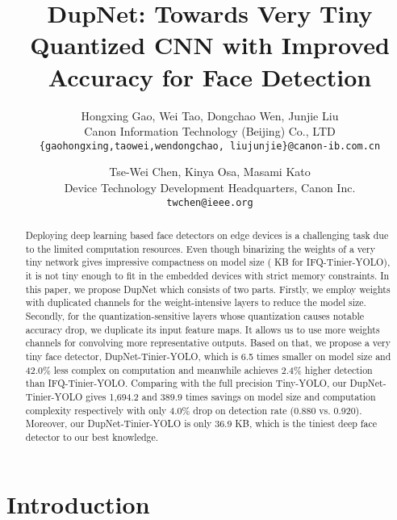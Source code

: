 \documentclass[10pt,twocolumn,letterpaper]{article}
\begin{document}
\title{DupNet: Towards Very Tiny Quantized CNN  with Improved Accuracy for Face Detection}

\author{Hongxing Gao, Wei Tao, Dongchao Wen, Junjie Liu\\
	Canon Information Technology (Beijing) Co., LTD\\
{\tt\small \{gaohongxing,taowei,wendongchao, liujunjie\}@canon-ib.com.cn}
\and
	Tse-Wei Chen, Kinya Osa, Masami Kato\\
	Device Technology Development Headquarters, Canon Inc.\\
{\tt\small twchen@ieee.org}
}

\maketitle

\ifcvprfinal\thispagestyle{empty}\fi

\begin{abstract}
		
Deploying deep learning based face detectors on edge devices is a challenging task due to the limited computation resources. Even though binarizing the weights of a very tiny network gives impressive compactness on model size ( KB for IFQ-Tinier-YOLO), it is not tiny enough to fit in the embedded devices with strict memory constraints. In this paper, we propose DupNet which consists of two parts. Firstly, we employ weights with duplicated channels for the weight-intensive layers to reduce the model size. Secondly, for the quantization-sensitive layers whose quantization causes notable accuracy drop, we duplicate its input feature maps. It allows us to use more weights channels for convolving more representative outputs. Based on that, we propose a very tiny face detector, DupNet-Tinier-YOLO, which is 6.5 times smaller on model size and 42.0\% less complex on computation and meanwhile achieves 2.4\% higher detection than IFQ-Tinier-YOLO. Comparing with the full precision Tiny-YOLO, our DupNet-Tinier-YOLO gives 1,694.2 and 389.9 times savings on model size and computation complexity respectively with only 4.0\% drop on detection rate (0.880 vs. 0.920). Moreover, our DupNet-Tinier-YOLO is only 36.9 KB, which is the tiniest deep face detector to our best knowledge.
	
\end{abstract}

\section{Introduction}\label{sec:intro}
\end{document}
